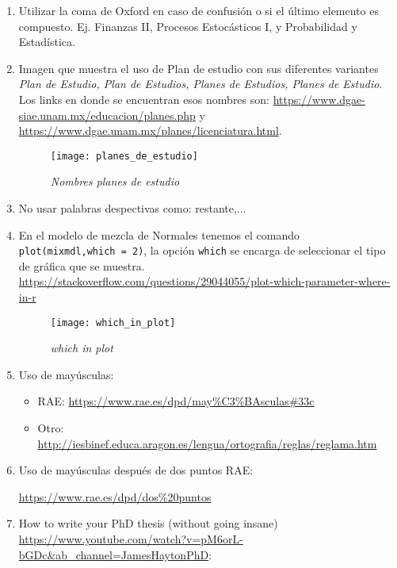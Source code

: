 \begin{appendices}
\begin{enumerate}
  \item Utilizar la coma de Oxford en caso de confusión o si el último elemento es compuesto. Ej. Finanzas II, Procesos Estocásticos I, y Probabilidad y Estadística.
  
  \item Imagen que muestra el uso de Plan de estudio con sus diferentes variantes \textit{Plan de Estudio, Plan de Estudios, Planes de Estudios, Planes de Estudio}. Los links en donde se encuentran esos nombres son: \url{https://www.dgae-siae.unam.mx/educacion/planes.php} y \url{https://www.dgae.unam.mx/planes/licenciatura.html}.

\begin{figure}[H]
\centering
\texttt{[image: planes\_de\_estudio]} %
\caption{\textit{Nombres planes de estudio}}
\end{figure}
  
  \item No usar palabras despectivas como: restante,...
  
  \item En el modelo de mezcla de Normales tenemos el comando \verb+plot(mixmdl,which = 2)+, la opción \verb+which+ se encarga de seleccionar el tipo de gráfica que se muestra. \url{https://stackoverflow.com/questions/29044055/plot-which-parameter-where-in-r}
  
\begin{figure}[H]
\centering
\texttt{[image: which\_in\_plot]} %
\caption{\textit{which in plot}}
\end{figure}
  
  \item Uso de mayúsculas:
  \begin{itemize}
  \item RAE: \url{https://www.rae.es/dpd/may\%C3\%BAsculas#33c}
  
  \item Otro: \url{http://iesbinef.educa.aragon.es/lengua/ortografia/reglas/reglama.htm}
  \end{itemize}
  
  \item Uso de mayúsculas después de dos puntos RAE:
  
  \url{https://www.rae.es/dpd/dos\%20puntos}
  
  \item How to write your PhD thesis (without going insane) \url{https://www.youtube.com/watch?v=pM6orL-bGDc&ab_channel=JamesHaytonPhD}:
  

\end{enumerate}
\end{appendices}
